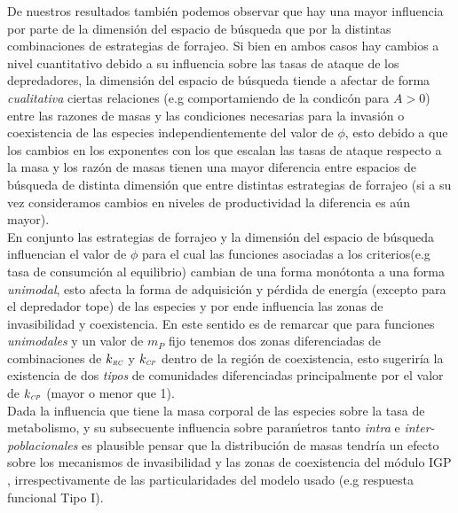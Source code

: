 De nuestros resultados tambi\'en podemos observar que hay una mayor influencia por parte de la dimensi\'on del espacio de b\'usqueda que por la distintas combinaciones de estrategias de forrajeo. Si bien en ambos casos hay cambios a nivel cuantitativo debido a su influencia sobre las tasas de ataque de los depredadores, la dimensi\'on del espacio de b\'usqueda tiende a afectar de forma \emph{cualitativa} ciertas relaciones (e.g comportamiendo de la condic\'on para $A >0$) entre las razones de masas y las condiciones necesarias para la invasi\'on o coexistencia de las especies independientemente del valor de $\phi$, esto debido a que los cambios en los exponentes con los que escalan las tasas de ataque respecto a la masa y los raz\'on de masas tienen una mayor diferencia entre espacios de b\'usqueda de distinta dimensi\'on que entre distintas estrategias de forrajeo (si a su vez consideramos cambios en niveles de productividad la diferencia es a\'un mayor). \\

En conjunto las estrategias de forrajeo y la dimensi\'on del espacio de b\'usqueda influencian el valor de $\phi$ para el cual las funciones asociadas a los criterios(e.g tasa de consumci\'on al equilibrio) cambian de una forma mon\'otonta a una forma \emph{unimodal}, esto afecta la forma de adquisici\'on y p\'erdida de energ\'ia (excepto para el depredador tope) de las especies y por ende influencia las zonas de invasibilidad y coexistencia. En este sentido es de remarcar que para funciones \emph{unimodales} y un valor de $m_P$ fijo tenemos dos zonas diferenciadas de combinaciones de $k_{\textit{\tiny RC}}$ y $k_{\textit{\tiny CP}}$ dentro de la regi\'on de coexistencia, esto sugerir\'ia la existencia de dos \emph{tipos} de comunidades diferenciadas principalmente por el valor de $k_{\textit{\tiny CP}}$ (mayor o menor que 1). \\

Dada la influencia que tiene la masa corporal de las especies sobre la tasa de metabolismo, y su subsecuente influencia sobre para\'metros tanto \emph{intra} e \emph{inter-poblacionales} \citep{savage2004predominance,brown2004toward,west1997general,savage2004effects,pawar2012dimensionality,mcgill2006allometric,peters1986ecological,kiltie2000scaling,yodzis1992body} es plausible pensar que la distribuci\'on de masas tendr\'ia un efecto sobre los mecanismos de invasibilidad y las zonas de coexistencia del m\'odulo IGP , irrespectivamente de las particularidades del modelo usado (e.g respuesta funcional Tipo I).\\




